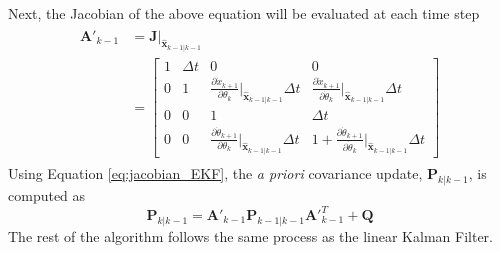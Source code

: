 \documentclass{article}
\newcommand{\matr}[1]{\bm{#1}}     %
\begin{document}
Next, the Jacobian of the above equation will be evaluated at each time step
\begin{align}
\begin{aligned}
\matr{A'}_{k-1} &= \matr{J}\bigr|_{\hat{\matr{x}}_{k-1|k-1}} \\
&= \begin{bmatrix}
1 & \Delta t & 0 & 0 \\[8pt]
0 & 1 & \frac{\partial \dot{x}_{k+1}}{\partial \theta_k}\Big|_{\hat{\matr{x}}_{k-1|k-1}}\Delta t & \frac{\partial \dot{x}_{k+1}}{\partial \dot{\theta}_k}\Big|_{\hat{\matr{x}}_{k-1|k-1}}\Delta t \\[8pt]
0 & 0 & 1 & \Delta t \\[8pt]
0 & 0 & \frac{\partial \dot{\theta}_{k+1}}{\partial \theta_k}\Big|_{\hat{\matr{x}}_{k-1|k-1}}\Delta t & 1+\frac{\partial \dot{\theta}_{k+1}}{\partial \dot{\theta}_k}\Big|_{\hat{\matr{x}}_{k-1|k-1}}\Delta t
\end{bmatrix}
\end{aligned}
\label{eq:jacobian_EKF}
\end{align}
Using Equation \ref{eq:jacobian_EKF}, the \textit{a priori} covariance update, $\matr{P}_{k|k-1}$, is computed as
\begin{equation}
\matr{P}_{k|k-1} = \matr{A}'_{k-1} \matr{P}_{k-1|k-1} {\matr{A}'}_{k-1}^T + \matr{Q}
\end{equation}
The rest of the algorithm follows the same process as the linear Kalman Filter. 
\end{document}
